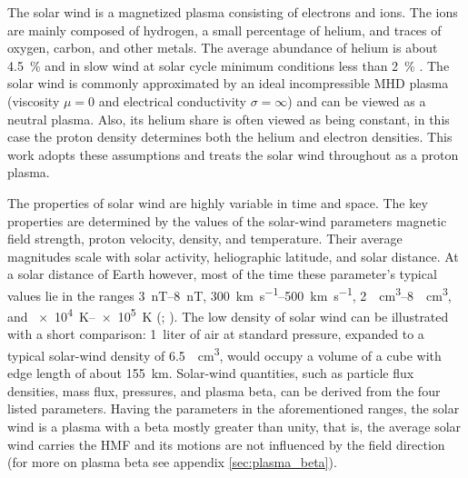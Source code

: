The solar wind is a magnetized plasma consisting of electrons and ions. The ions are mainly composed of hydrogen, a small percentage of helium, and traces of oxygen, carbon, and other metals. The average abundance of helium is about \SI{4.5}{\%} and in slow wind at solar cycle minimum conditions less than \SI{2}{\%} \citep{Feldman1978,Schwenn1983,Kasper2012}.
The solar wind is commonly approximated by an ideal incompressible MHD plasma (viscosity $\mu = 0$ and electrical conductivity $\sigma = \infty$) and can be viewed as a neutral plasma. Also, its helium share is often viewed as being constant, in this case the proton density determines both the helium and electron densities. This work adopts these assumptions and treats the solar wind throughout as a proton plasma.

The properties of solar wind are highly variable in time and space. The key properties are determined by the values of the solar-wind parameters magnetic field strength, proton velocity, density, and temperature. Their average magnitudes scale with solar activity, heliographic latitude, and solar distance. At a solar distance of Earth however, most of the time these parameter's typical values lie in the ranges \SIrange{3}{8}{\nano\tesla}, \SIrange{300}{500}{\km\per\s}, \SIrange{2}{8}{\per\cm\cubed}, and \SIrange{e4}{e5}{\K} (\citealp[p.~92]{Kivelson1995}; \citealt{Venzmer2017}). The low density of solar wind can be illustrated with a short comparison: 1~liter of air at standard pressure, expanded to a typical solar-wind density of \SI{6.5}{\per\cm\cubed}, would occupy a volume of a cube with edge length of about \SI{155}{\km}.
Solar-wind quantities, such as particle flux densities, mass flux, pressures, and plasma beta, can be derived from the four listed parameters. Having the parameters in the aforementioned ranges, the solar wind is a plasma with a beta mostly greater than unity, that is, the average solar wind carries the HMF and its motions are not influenced by the field direction (for more on plasma beta see appendix \autoref{sec:plasma_beta}).

